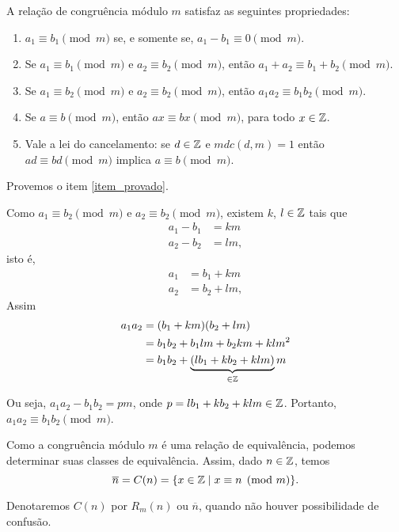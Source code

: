 \begin{teorema}
	A rela{\c c}{\~a}o de congru{\^e}ncia m{\'o}dulo $m$ satisfaz as seguintes propriedades:
	\begin{enumerate}[label={\roman*})]
		\item $a_{1}\equiv b_{1}\pmod{m}$ se, e somente se, $a_{1}-b_{1}\equiv 0\pmod{m}$.
		\item Se $a_{1}\equiv b_{1}\pmod{m}$ e $a_{2}\equiv b_{2}\pmod{m}$, ent{\~a}o $a_{1}+a_{2}\equiv b_{1}+b_{2}\pmod{m}$.
		\item Se $a_{1}\equiv b_{2}\pmod{m}$ e $a_{2}\equiv b_{2}\pmod{m}$, ent{\~a}o $a_{1}a_{2}\equiv b_{1}b_{2}\pmod{m}$.\label{item_provado}
		\item Se $a\equiv b\pmod{m}$, ent{\~a}o $ax\equiv bx\pmod{m}$, para todo $x \in \mathbb{Z}$.
		\item Vale a lei do cancelamento: se $d \in \mathbb{Z}$ e $mdc(d,m) = 1$ ent{\~a}o $ad \equiv bd \pmod{m}$ implica $a\equiv b \pmod{m}$.
	\end{enumerate}
\end{teorema}
\begin{prova}
	Provemos o item \ref{item_provado}.
	
	Como $a_{1}\equiv b_{2}\pmod{m}$ e $a_{2}\equiv b_{2}\pmod{m}$, existem $k$, $l \in \mathbb{Z}$ tais que
	\begin{align*}
		a_1 - b_1 &= km\\
		a_2 - b_2 &= lm,
	\end{align*}
	isto é,
	\begin{align*}
		a_1 &= b_1 + km\\
		a_2 &= b_2 + lm,
	\end{align*}
	Assim
	\begin{align*}
		a_1a_2 &= (b_1 + km)(b_2 + lm) \\ &= b_1b_2 + b_1lm + b_2km + klm^2 \\ &= b_1b_2 + \underbrace{(lb_{1}+kb_{2}+klm)}_{\in \mathbb{Z}}m
	\end{align*}
	
	Ou seja, $a_1a_2 - b_1b_2 = pm$, onde $p = lb_1 + kb_2 + klm \in \mathbb{Z}$. Portanto, $a_1a_2 \equiv b_1b_2 \pmod{m}$.
\end{prova}

Como a congru{\^e}ncia m{\'o}dulo $m$ {\'e} uma rela{\c c}{\~a}o de equival{\^e}ncia, podemos determinar suas classes de equival{\^e}ncia. Assim, dado $n \in \mathbb{Z}$, temos
\[
	\overline{n} = C(n) = \{x \in \mathbb{Z} \mid x\equiv n \pmod{m}\}.
\]

Denotaremos $C(n)$ por $R_{m}(n)$ ou $\overline{n}$, quando n{\~a}o houver possibilidade de confus{\~a}o.

